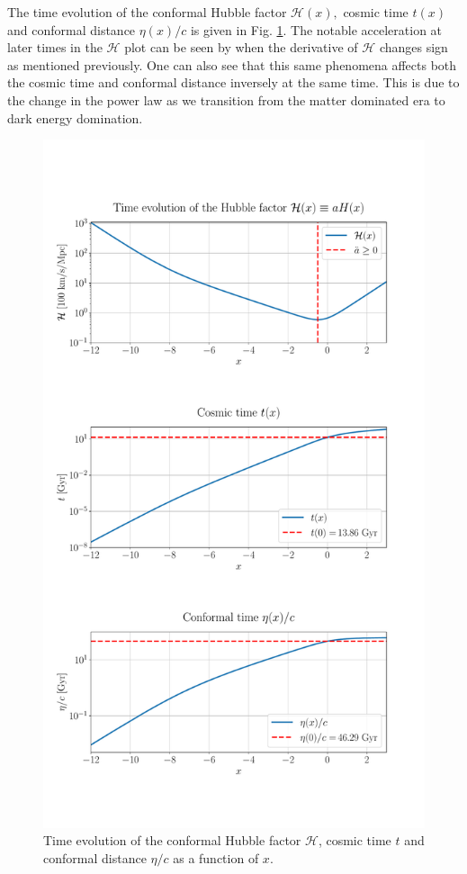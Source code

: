 \documentclass[%
reprint,
 amsmath,amssymb,
 aps,
]{revtex4-2}
\newcommand{\Hp}{\mathcal{H}}
\begin{document}
The time evolution of the conformal Hubble factor $\Hp(x),$ cosmic time $t(x)$ and conformal distance $\eta(x)/c$ is given in Fig. \ref{fig:TimeEvHp}. The notable acceleration at later times in the $\Hp$ plot can be seen by when the derivative of $\Hp$ changes sign as mentioned previously. One can also see that this same phenomena affects both the cosmic time and conformal distance inversely at the same time. This is due to the change in the power law as we transition from the matter dominated era to dark energy domination.
\begin{figure}[ht!]
	\includegraphics[width = \linewidth]{Figures/merge_Hp_t_eta_Ev.pdf}
	\caption{Time evolution of the conformal Hubble factor $\Hp$, cosmic time $t$ and conformal distance $\eta/c$ as a function of $x$.}
	\label{fig:TimeEvHp}
\end{figure}
\end{document}
